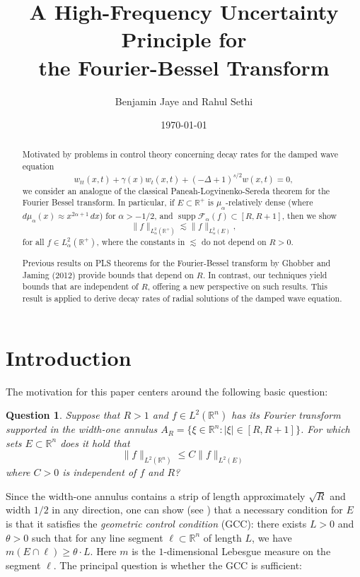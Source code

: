 \documentclass[11pt,a4paper,reqno,dvipsnames]{amsart}
\author{Benjamin Jaye and Rahul Sethi}
\title[A High-Frequency Uncertainty Principle for the Fourier-Bessel Transform]{A High-Frequency Uncertainty Principle for\\ the Fourier-Bessel Transform}
\date{\today}
\newcommand{\R}{\mathbb R}
\numberwithin{equation}{section}
\theoremstyle{plain}
\newtheorem{question}{Question}
\theoremstyle{definition}
\theoremstyle{remark}
\begin{document}
\begin{abstract}

Motivated by problems in control theory concerning decay rates for the damped wave equation 
$$w_{tt}(x,t) + \gamma(x) w_t(x,t) + (-\Delta + 1)^{s/2} w(x,t) = 0,$$
we consider an analogue of the classical Paneah-Logvinenko-Sereda theorem for the Fourier Bessel transform. In particular, if $E \subset \mathbb{R}^+$ is $\mu_\alpha$-relatively dense (where $d\mu_\alpha(x) \approx x^{2\alpha+1}\, dx$) for $\alpha > -1/2$, and $\operatorname{supp} \mathcal{F}_\alpha(f) \subset [R,R+1]$, then we show 
$$\|f\|_{L^2_\alpha(\mathbb{R}^+)} \lesssim \|f\|_{L^2_\alpha(E)},$$
for all $f\in L^2_\alpha(\mathbb{R}^+)$, where the constants in $\lesssim$ do not depend on $R > 0$.

Previous results on PLS theorems for the Fourier-Bessel transform by Ghobber and Jaming (2012) provide bounds that depend on $R$. In contrast, our techniques yield bounds that are independent of $R$, offering a new perspective on such results. This result is applied to derive decay rates of radial solutions of the damped wave equation.  

 \end{abstract}

\maketitle


\section{Introduction}
The motivation for this paper centers around the following basic question:

\begin{question}\label{genann} Suppose that $R>1$ and $f\in L^2(\R^n)$ has its Fourier transform supported in the width-one annulus $A_R = \{\xi\in \R^n:|\xi|\in [R, R+1]\}$.  For which sets $E\subset \R^n$ does it hold that
\begin{equation}
\label{pls-independent}
    \|f\|_{L^2(\R^n)}\leq C\|f\|_{L^2(E)}
\end{equation}
where $C>0$ is independent of $f$ and $R$?
\end{question}

Since the width-one annulus contains a strip of length approximately $\sqrt{R}$ and width $1/2$ in any direction, one can show (see \cite{green-jaye-mitkovski}) that a necessary condition for $E$ is that it satisfies the \emph{geometric control condition} (GCC):  there exists $L>0$ and $\theta>0$ such that for any line segment $\ell\subset \R^n$ of length $L$, we have $m(E\cap \ell)\geq \theta\cdot L$. Here $m$ is the $1$-dimensional Lebesgue measure on the segment $\ell$.  The principal question is whether the GCC is sufficient:
\end{document}
